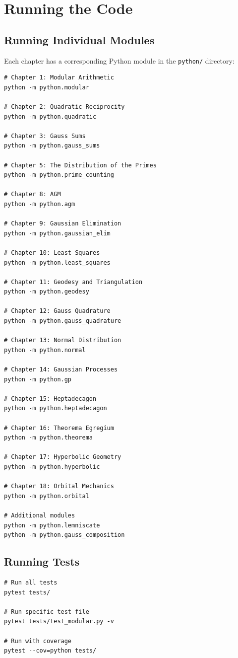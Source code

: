\section{Running the Code}

\subsection{Running Individual Modules}

Each chapter has a corresponding Python module in the \texttt{python/} directory:

\begin{lstlisting}[style=bash]
# Chapter 1: Modular Arithmetic
python -m python.modular

# Chapter 2: Quadratic Reciprocity
python -m python.quadratic

# Chapter 3: Gauss Sums
python -m python.gauss_sums

# Chapter 5: The Distribution of the Primes
python -m python.prime_counting

# Chapter 8: AGM
python -m python.agm

# Chapter 9: Gaussian Elimination
python -m python.gaussian_elim

# Chapter 10: Least Squares
python -m python.least_squares

# Chapter 11: Geodesy and Triangulation
python -m python.geodesy

# Chapter 12: Gauss Quadrature
python -m python.gauss_quadrature

# Chapter 13: Normal Distribution
python -m python.normal

# Chapter 14: Gaussian Processes
python -m python.gp

# Chapter 15: Heptadecagon
python -m python.heptadecagon

# Chapter 16: Theorema Egregium
python -m python.theorema

# Chapter 17: Hyperbolic Geometry
python -m python.hyperbolic

# Chapter 18: Orbital Mechanics
python -m python.orbital

# Additional modules
python -m python.lemniscate
python -m python.gauss_composition
\end{lstlisting}

\subsection{Running Tests}

\begin{lstlisting}[style=bash]
# Run all tests
pytest tests/

# Run specific test file
pytest tests/test_modular.py -v

# Run with coverage
pytest --cov=python tests/
\end{lstlisting}

